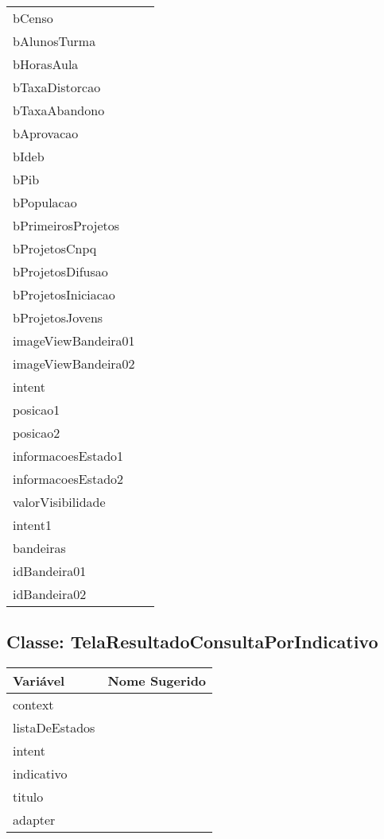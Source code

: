\documentclass[12pt]{article}
\begin{document}
\begin{table}[H]
\begin{center}
\begin{tabular}{l | l}
						bCenso & \\
						bAlunosTurma & \\
						bHorasAula & \\
						bTaxaDistorcao & \\
						bTaxaAbandono & \\
						bAprovacao & \\
						bIdeb & \\
						bPib & \\
						bPopulacao & \\
						bPrimeirosProjetos & \\
						bProjetosCnpq & \\
						bProjetosDifusao & \\
						bProjetosIniciacao & \\
						bProjetosJovens & \\
						imageViewBandeira01 & \\
						imageViewBandeira02 & \\
						intent & \\
						posicao1 & \\
						posicao2 & \\
						informacoesEstado1 & \\
						informacoesEstado2 & \\
						valorVisibilidade & \\
						intent1 & \\
						bandeiras & \\
						idBandeira01 & \\
						idBandeira02 & \\
					\bottomrule
				\end{tabular}
			\end{center}
		\end{table}

	\subsection{Classe: TelaResultadoConsultaPorIndicativo}
		\begin{table}[H]
			\begin{center}
				\begin{tabular}{l | l}
					\toprule
						Variável & Nome Sugerido\\
					\midrule
						context & \\
						listaDeEstados & \\
						intent & \\
						indicativo & \\
						titulo & \\
						adapter & \\
					\bottomrule
				\end{tabular}
			\end{center}
		\end{table}
\end{document}
